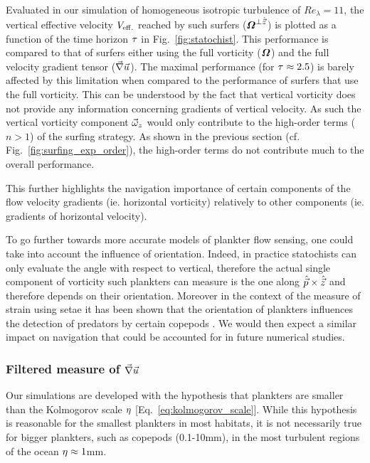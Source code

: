 Evaluated in our simulation of homogeneous isotropic turbulence of $\mathit{Re}_{\lambda} = 11$, the vertical effective velocity $V_{\mathrm{eff.}}$ reached by such surfers ($\boldsymbol{\varOmega}^{\bot \hat{\vec{z}}}$) is plotted as a function of the time horizon $\tau$ in Fig.~\ref{fig:statochist}.
This performance is compared to that of surfers either using the full vorticity ($\boldsymbol{\varOmega}$) and the full velocity gradient tensor ($\vec{\nabla} \vec{u}$).
The maximal performance (for $\tau \approx 2.5$) is barely affected by this limitation when compared to the performance of surfers that use the full vorticity.
This can be understood by the fact that vertical vorticity does not provide any information concerning gradients of vertical velocity.
As such the vertical vorticity component $\vec{\omega}_z$ would only contribute to the high-order terms ($n > 1$) of the surfing strategy.
As shown in the previous section (cf. Fig.~\ref{fig:surfing_exp_order}), the high-order terms do not contribute much to the overall performance.

This further highlights the navigation importance of certain components of the flow velocity gradients (ie. horizontal vorticity) relatively to other components (ie. gradients of horizontal velocity).

To go further towards more accurate models of plankter flow sensing, one could take into account the influence of orientation.
Indeed, in practice statochists can only evaluate the angle with respect to vertical, therefore the actual single component of vorticity such plankters can measure is the one along $\hat{\vec{p}} \times \hat{\vec{z}}$ and therefore depends on their orientation.
Moreover in the context of the measure of strain using setae it has been shown that the orientation of plankters influences the detection of predators by certain copepods \citep{fields2010orientation}.
We would then expect a similar impact on navigation that could be accounted for in future numerical studies.

\subsubsection{Filtered measure of $\vec{\nabla} \vec{u}$}\label{sec:rob_filtered_measure}

Our simulations are developed with the hypothesis that plankters are smaller than the Kolmogorov scale $\eta$ [Eq.~\ref{eq:kolmogorov_scale}].
While this hypothesis is reasonable for the smallest plankters in most habitats, it is not necessarily true for bigger plankters, such as copepods (0.1-10mm), in the most turbulent regions of the ocean $\eta \approx 1$mm.


